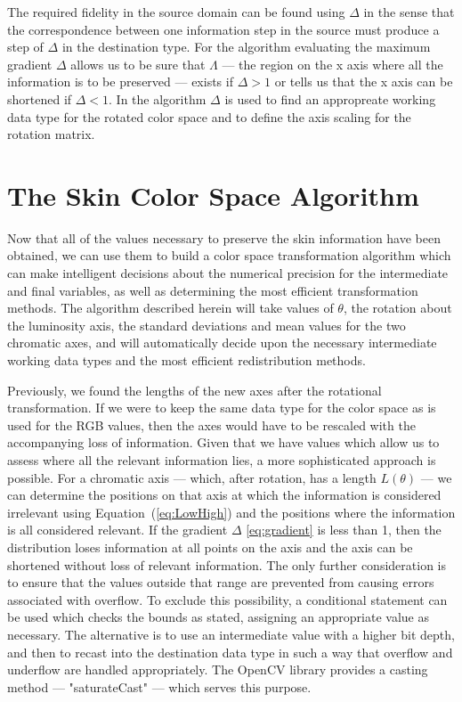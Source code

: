 The required fidelity in the source domain can be found using $ \Delta$ in the sense that the correspondence between one information step in the source must produce a step of $\Delta$ in the destination type. For the algorithm evaluating the maximum gradient $\Delta$ allows us to be sure that  $\Lambda$ --- the region on the x axis where all the information is to be preserved --- exists if $\Delta >1$ or tells us that the x axis can be shortened if  $\Delta < 1$. In the algorithm $\Delta$ is used to find an appropreate working data type for the rotated color space and to define the axis scaling for the rotation matrix.

\section{The Skin Color Space Algorithm}

Now that all of the values necessary to preserve the skin information have been obtained, we can use them to build a color space transformation algorithm which can make intelligent decisions about the numerical precision for the intermediate and final variables, as well as determining the most efficient transformation methods. The algorithm described herein will take values of $\theta$, the rotation about the luminosity axis, the standard deviations and mean values for the two chromatic axes, and will automatically decide upon the necessary intermediate working data types and the most efficient redistribution methods.

Previously, we found the lengths of the new axes after the rotational transformation. If we were to keep the same data type for the color space as is used for the RGB values, then the axes would have to be rescaled with the accompanying loss of information. Given that we have values which allow us to assess where all the relevant information lies, a more sophisticated approach is possible. For a chromatic axis --- which, after rotation, has a length $L(\theta)$ --- we can determine the positions on that axis at which the information is considered irrelevant using Equation~(\ref{eq:LowHigh}) and the positions where the information is all considered relevant. If the gradient $ \Delta$ \ref{eq:gradient} is less than 1, then the distribution loses information at all points on the axis and the axis can be shortened without loss of relevant information. The only further consideration is to ensure that the values outside that range are prevented from causing errors associated with overflow. To exclude this possibility, a conditional statement can be used which checks the bounds as stated, assigning an appropriate value as necessary. The alternative is to use an intermediate value with a higher bit depth, and then to recast into the destination data type in such a way that overflow and underflow are handled appropriately. The OpenCV library provides a casting method --- "saturateCast" --- which serves this purpose.

